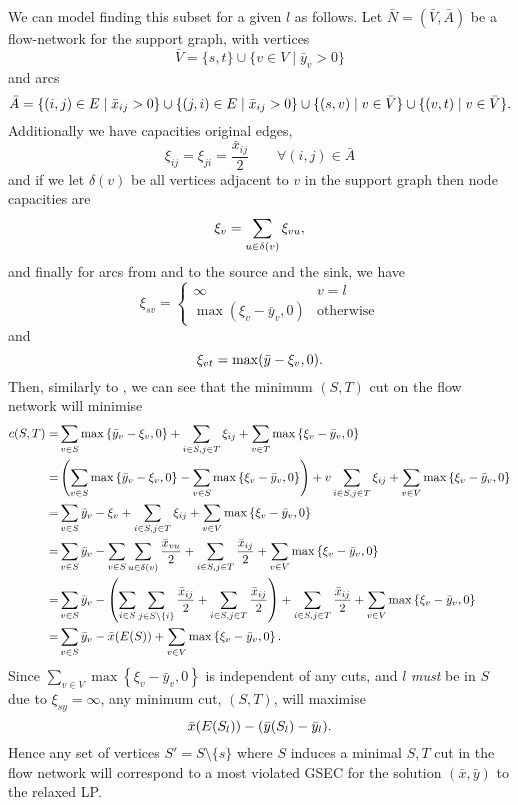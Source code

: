   We can model finding this subset for a given $l$ as follows. Let $\bar{N} = (\bar{V}, \bar{A})$ be a flow-network
  for the support graph, with vertices
  $$\bar V = \{s, t\} \cup \{v \in V \mid \bar y_v > 0 \}$$
  and arcs
  $$\bar A = \{(i, j) \in E \mid \bar x_{ij} > 0 \} \cup \{(j, i) \in E \mid \bar x_{ij} > 0\} \cup \{(s, v) \mid v \in \bar V\} \cup \{(v, t) \mid v \in \bar V\}\mathnormal{.}$$
  Additionally we have capacities original edges,
  $$\xi_{ij} = \xi_{ji} = \frac{\bar x_{ij}}{2} \qquad \forall (i,j) \in \bar A$$
  and if we let $\delta (v)$ be all vertices adjacent to $v$ in the support graph then node capacities are
  $$\xi_v = \sum_{u \in \delta(v)} \xi_{vu}\mathnormal{,}$$
  and finally
  for arcs from and to the source and the sink, we have
  $$\xi_{sv} =
  \begin{cases}
    \infty & v = l \\
    \max(\xi_v - \bar y_v, 0) & \text{otherwise}
  \end{cases}$$
  and
  $$\xi_{vt} = \max(\bar y - \xi_v, 0)\mathnormal{.}$$
  Then, similarly to \citet{padberg1983trees}, we can see that
  the minimum $(S,T)$ cut on the flow network will minimise
  \begin{align*}
    c(S,T) = &\sum_{v \in S} \max \left\{\bar y_v - \xi_v, 0\right\} +
               \sum_{i \in S, j \in T} \xi_{ij} +
               \sum_{v \in T} \max\left\{\xi_v - \bar y_v, 0\right\} \\
    =&\left(\sum_{v \in S} \max \left\{\bar y_v - \xi_v, 0\right\} - \sum_{v \in S} \max\left\{\xi_v - \bar y_v, 0\right\} \right) +
v       \sum_{i \in S, j \in T}  \xi_{ij} +
       \sum_{v \in V} \max\left\{\xi_v - \bar y_v, 0\right\} \\
    =&\sum_{v \in S} \bar y_v - \xi_v +
       \sum_{i \in S, j \in T} \xi_{ij} +
       \sum_{v \in V} \max\left\{\xi_v - \bar y_v, 0\right\} \\
    =&\sum_{v \in S} \bar y_v -
       \sum_{v \in S} \sum_{u \in \delta(v)} \frac{\bar x_{vu}}{2} +
       \sum_{i \in S, j \in T} \frac{\bar x_{ij}}{2} +
       \sum_{v \in V} \max\left\{\xi_v - \bar y_v, 0\right\} \\
    =&\sum_{v \in S} \bar y_v -
       \left(\sum_{i \in S} \sum_{j \in S \setminus \{i\}} \frac{\bar x_{ij}}{2} +
       \sum_{i \in S, j \in T} \frac{\bar x_{ij}}{2}\right) +
       \sum_{i \in S, j \in T} \frac{\bar x_{ij}}{2} +
       \sum_{v \in V} \max\left\{\xi_v - \bar y_v, 0\right\} \\
    =&\sum_{v \in S} \bar y_v -
       \bar x (E(S)) +
       \sum_{v \in V} \max\left\{\xi_v - \bar y_v, 0\right\}\mathnormal{.}
  \end{align*}
  Since $\sum_{v \in V} \max\left\{\xi_v - \bar y_v, 0\right\}$ is independent of
  any cuts, and
  $l$ \textit{must} be in $S$ due to $\xi_{sy} = \infty$, any minimum cut, $(S,T)$, will maximise
  $$\bar x (E(S_l)) - (\bar y (S_l) - \bar y_l)\mathnormal{.}$$
  Hence any set of vertices $S' = S \setminus \{s\}$ where $S$ induces a minimal $S,T$ cut in the flow network will correspond to
  a most violated GSEC for the solution $(\bar x, \bar y)$ to the relaxed LP.

